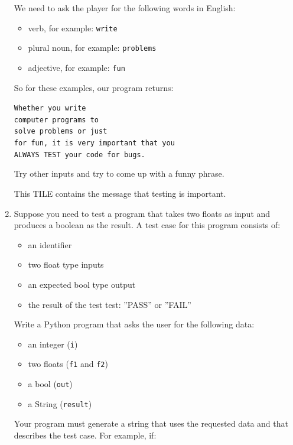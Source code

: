 \documentclass[
  fontsize=10pt,
  a4paper,
]{scrartcl}
\newenvironment{domainTILEd}%
  {\begin{mdframed}[skipabove=10pt,skipbelow=10pt,backgroundcolor=green!20]}%
  {\end{mdframed}}
\begin{document}
\begin{enumerate}
We need to ask the player for the following words in English:

\begin{itemize}
\item verb, for example: {\tt write}
\item plural noun, for example: {\tt problems}
\item adjective, for example: {\tt fun}
\end{itemize}

So for these examples, our program returns:

{\tt Whether you write\\ computer programs to\\ solve problems or just\\ for fun, it is very important that you\\ ALWAYS TEST your code for bugs. 
 }

Try other inputs and try to come up with a funny phrase.


\begin{domainTILEd}
This TILE contains the message that testing is important.
\end{domainTILEd}

\item Suppose you need to test a program that takes two floats as input and produces a boolean as the result. A test case for this program consists of:
   
   \begin{itemize}
      \item an identifier
      \item two float type inputs 
      \item an expected bool type output
      \item the result of the test test: ''PASS'' or ''FAIL''
  \end{itemize}
  
Write a Python program that asks the user for the following data:
  
  \begin{itemize}
      \item an integer ({\tt i})
      \item two floats ({\tt f1} and {\tt f2})
      \item a bool ({\tt out})
      \item a String ({\tt result})
  \end{itemize}
  
Your program must generate a string that uses the requested data and that describes the test case. For example, if:
  

\end{enumerate}
\end{document}
